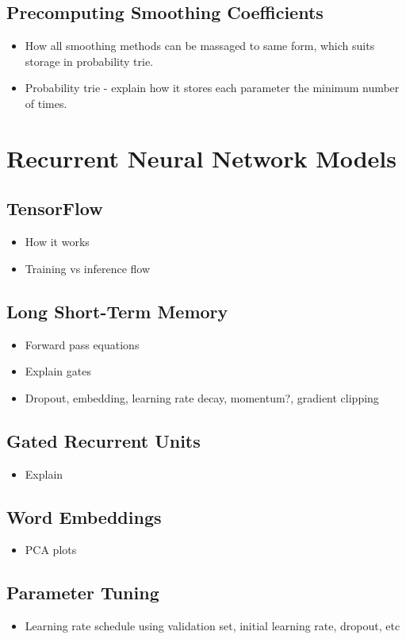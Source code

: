\documentclass[a4paper, 12pt]{report}
\begin{document}
\subsection{Precomputing Smoothing Coefficients}
\begin{itemize}
\item
	How all smoothing methods can be massaged to same form, which suits storage in probability trie.
\item
	Probability trie - explain how it stores each parameter the minimum number of times.
\end{itemize}
\section{Recurrent Neural Network Models}
\subsection{TensorFlow}
\begin{itemize}
\item
	How it works
\item
	Training vs inference flow
\end{itemize}
\subsection{Long Short-Term Memory}
\begin{itemize}
\item
	Forward pass equations
\item
	Explain gates
\item
	Dropout, embedding, learning rate decay, momentum?, gradient clipping
\end{itemize}
\subsection{Gated Recurrent Units}
\begin{itemize}
\item
	Explain
\end{itemize}
\subsection{Word Embeddings}
\begin{itemize}
\item
	PCA plots
\end{itemize}
\subsection{Parameter Tuning}
\begin{itemize}
\item
	Learning rate schedule using validation set, initial learning rate, dropout, etc
\end{itemize}
\end{document}
